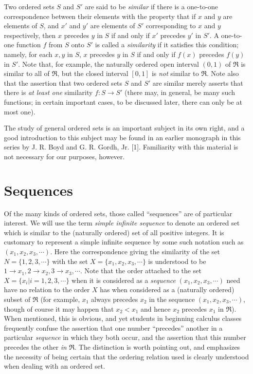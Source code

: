 \documentclass{article}
\begin{document}
Two ordered sets $S$ and $S'$ are said to be \emph{similar} if there is a one-to-one correspondence between their elements with the property that if $x$ and $y$ are elements of $S$, and $x'$ and $y'$ are elements of $S'$ corresponding to $x$ and $y$ respectively, then $x$ precedes $y$ in $S$ if and only if $x'$ precedes $y'$ in $S'$. A one-to-one function $f$ from $S$ onto $S'$ is called a \emph{similarity} if it satisfies this condition; namely, for each $x,y$ in $S$, $x$ precedes $y$ in $S$ if and only if $f(x)$ precedes $f(y)$ in $S'$. Note that, for example, the naturally ordered open interval $(0,1)$ of $\Re$ is similar to all of $\Re$, but the closed interval $[0,1]$ is \emph{not} similar to $\Re$. Note also that the assertion that two ordered sets $S$ and $S'$ are similar merely asserts that there is \emph{at least one} similarity $f: S \rightarrow S'$ (there may, in general, be many such functions; in certain important cases, to be discussed later, there can only be at most one).

The study of general ordered sets is an important subject in its own right, and a good introduction to this subject may be found in an earlier monograph in this series by J. R. Boyd and G. R. Gordh, Jr. [1]. Familiarity with this material is not necessary for our purposes, however.


\section{Sequences}


Of the many kinds of ordered sets, those called ``sequences'' are of particular interest. We will use the term \emph{simple infinite sequence} to denote an ordered set which is similar to the (naturally ordered) set of all positive integers. It is customary to represent a simple infinite sequence by some such notation such as $(x_1, x_2, x_3, \cdots)$. Here the correspondence giving the similarity of the set $N = \{ 1, 2, 3, \cdots \}$ with the set $X = \{ x_1, x_2, x_3, \cdots \}$ is understood to be $1 \rightarrow x_1, 2 \rightarrow x_2, 3 \rightarrow x_3, \cdots$. Note that the order attached to the set $X = \{ x_i | i = 1, 2, 3, \cdots \}$ when it is considered as a \emph{sequence} $(x_1, x_2, x_3, \cdots)$ need have no relation to the order $X$ has when considered as a (naturally ordered) subset of $\Re$ (for example, $x_1$ always precedes $x_2$ in the sequence $(x_1, x_2, x_3, \cdots)$, though of course it may happen that $x_2 < x_1$ and hence $x_2$ precedes $x_1$ in $\Re$). When mentioned, this is obvious, and yet students in beginning calculus classes frequently confuse the assertion that one number ``precedes'' another in a particular \emph{sequence} in which they both occur, and the assertion that this number precedes the other \emph{in} $\Re$. The distinction is worth pointing out, and emphasizes the necessity of being certain that the ordering relation used is clearly understood when dealing with an ordered set.
\end{document}
